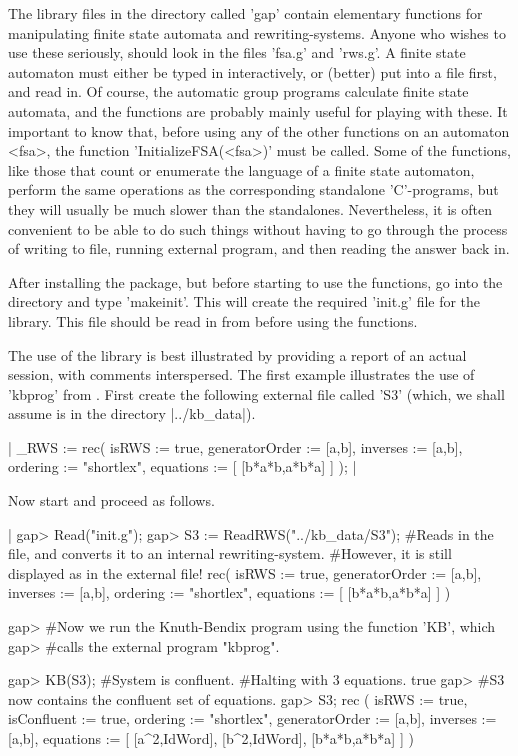 The library files in the directory called 'gap' contain elementary functions
for manipulating finite state automata and rewriting-systems.
Anyone who wishes to use these seriously, should look in the files 'fsa.g' and
'rws.g'. A finite state automaton must either be typed in
interactively, or (better) put into a file first, and read in. Of course,
the automatic group programs calculate finite state automata, and the
functions are probably mainly useful for playing with these. It important to
know that, before using any of the other {\GAP} functions on an automaton <fsa>,
the function 'InitializeFSA(<fsa>)' must be called. Some of the functions,
like those that count or enumerate the language of a finite state automaton,
perform the same operations as the corresponding standalone 'C'-programs,
but they will usually be much slower than the standalones. Nevertheless,
it is often convenient to be able to do such things without having to go
through the process of writing to file, running external program, and then
reading the answer back in.

After installing the package, but before starting to use the {\GAP} functions,
go into the {\GAP} directory and type 'makeinit'. This will create the
required 'init.g' file for the {\GAP} library.
This file should be read in from {\GAP} before using the functions.

The use of the library is best illustrated by providing a report of an
actual session, with comments interspersed.
The first example illustrates the use of 'kbprog' from {\GAP}.
First create the following external file called 'S3' (which, we shall assume
is in the directory |../kb_data|).

|
_RWS := rec(
           isRWS := true,
  generatorOrder := [a,b],
        inverses := [a,b],
        ordering := "shortlex",
       equations := [
         [b*a*b,a*b*a]
       ]
);
|

Now start {\GAP} and proceed as follows.

|
gap> Read("init.g");
gap> S3 := ReadRWS("../kb_data/S3");
#Reads in the file, and converts it to an internal rewriting-system.
#However, it is still displayed as in the external file!
rec(
           isRWS := true,
  generatorOrder := [a,b],
        inverses := [a,b],
        ordering := "shortlex",
       equations := [
         [b*a*b,a*b*a]
       ]
)

gap> #Now we run the Knuth-Bendix program using the function 'KB', which
gap> #calls the external program "kbprog".

gap> KB(S3);
#System is confluent.
#Halting with 3 equations.
true
gap> #S3 now contains the confluent set of equations.
gap> S3;
rec (
           isRWS := true,
     isConfluent := true,
        ordering := "shortlex",
  generatorOrder := [a,b],
        inverses := [a,b],
       equations := [
         [a^2,IdWord],
         [b^2,IdWord],
         [b*a*b,a*b*a]
       ]
)


